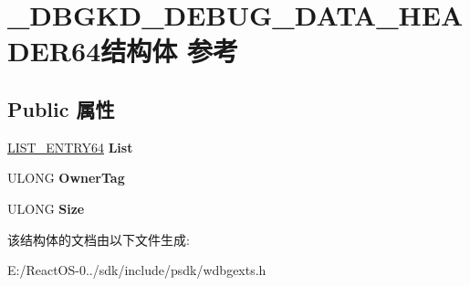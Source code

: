 \hypertarget{struct___d_b_g_k_d___d_e_b_u_g___d_a_t_a___h_e_a_d_e_r64}{}\section{\+\_\+\+D\+B\+G\+K\+D\+\_\+\+D\+E\+B\+U\+G\+\_\+\+D\+A\+T\+A\+\_\+\+H\+E\+A\+D\+E\+R64结构体 参考}
\label{struct___d_b_g_k_d___d_e_b_u_g___d_a_t_a___h_e_a_d_e_r64}
\subsection*{Public 属性}
\begin{DoxyCompactItemize}
\item 
\mbox{\label{struct___d_b_g_k_d___d_e_b_u_g___d_a_t_a___h_e_a_d_e_r64_a21ac368f220359a7cf00d4a7996b1222}} 
\hyperlink{struct_l_i_s_t___e_n_t_r_y64}{L\+I\+S\+T\+\_\+\+E\+N\+T\+R\+Y64} {\bfseries List}
\item 
\mbox{\label{struct___d_b_g_k_d___d_e_b_u_g___d_a_t_a___h_e_a_d_e_r64_a50c19879ff47d2665a36865880cc4dc5}} 
U\+L\+O\+NG {\bfseries Owner\+Tag}
\item 
\mbox{\label{struct___d_b_g_k_d___d_e_b_u_g___d_a_t_a___h_e_a_d_e_r64_a55407d01e2854d98a046743b94053154}} 
U\+L\+O\+NG {\bfseries Size}
\end{DoxyCompactItemize}


该结构体的文档由以下文件生成\+:\begin{DoxyCompactItemize}
\item 
E\+:/\+React\+O\+S-\/0../sdk/include/psdk/wdbgexts.\+h\end{DoxyCompactItemize}
